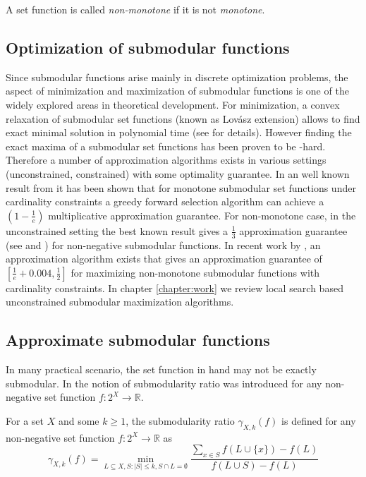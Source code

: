 \noindent A set function is called \emph{non-monotone} if it is not \emph{monotone}.

\subsection{Optimization of submodular functions}
Since submodular functions arise mainly in discrete optimization problems, the aspect of minimization and maximization of submodular functions is one of the widely explored areas in theoretical development. For minimization, a convex relaxation of submodular set functions (known as Lov{\'a}sz extension) allows to find exact minimal solution in polynomial time (see \citealp{DBLP:journals/corr/abs-1111-6453} for details). However finding the exact maxima of a submodular set functions has been proven to be \NP-hard. Therefore a number of approximation algorithms exists in various settings (unconstrained, constrained) with some optimality guarantee. In an well known result from \citealp{nemhauser1978analysis} it has been shown that for monotone submodular set functions under cardinality constraints a greedy forward selection algorithm can achieve a $(1-\frac{1}{e})$ multiplicative approximation guarantee. For non-monotone case, in the unconstrained setting the best known result gives a $\frac{1}{3}$ approximation guarantee (see \citealp{Feige:2011:MNS:2079073.2079078} and \citealp{Buchbinder:2012:TLT:2417500.2417835}) for non-negative submodular functions. In recent work by \citealp{Buchbinder:2014:SMC:2634074.2634180}, an approximation algorithm exists that gives an approximation guarantee of $[\frac{1}{e}+0.004,\frac{1}{2}]$ for maximizing non-monotone submodular functions with cardinality constraints. In chapter \ref{chapter:work} we review local search based unconstrained submodular maximization algorithms.

\subsection{Approximate submodular functions}
\label{subsection:approximate}
In many practical scenario, the set function in hand may not be exactly submodular. In \citealp{DasDK11} the notion of submodularity ratio was introduced for any non-negative set function $f:2^X\rightarrow \mathbb{R}$.

\begin{definition}
 For a set $X$ and some $k\ge 1$, the submodularity ratio $\gamma_{X,k}(f)$ is defined for any non-negative set function $f:2^X\rightarrow \mathbb{R}$ as
 \[
   \gamma_{X,k}(f)=\min_{L\subseteq X, S:|S|\le k, S\cap L=\emptyset}\frac{\sum_{x\in S}f(L\cup\{x\})-f(L)}{f(L\cup S)-f(L)}
 \]
\end{definition}

